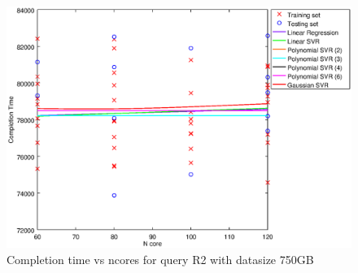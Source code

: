 
\begin {figure}[hbtp]
\centering
\includegraphics[width=\textwidth]{output/R2_750_LINEAR_NCORE/plot_R2_750.eps}
\caption{Completion time vs ncores for query R2 with datasize 750GB}
\label{fig:coreonly_linear_R2_750}
\end {figure}
